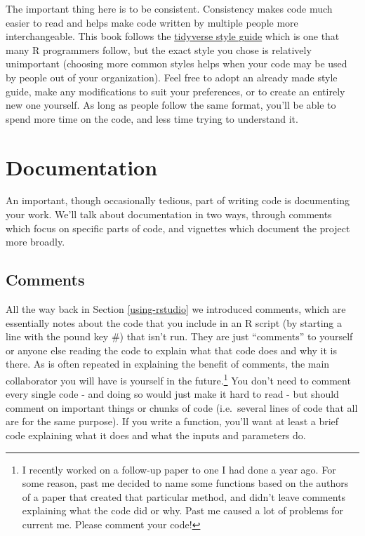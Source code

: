 \documentclass[
  12pt,
]{book}
\begin{document}
The important thing here is to be consistent. Consistency makes code much easier to read and helps make code written by multiple people more interchangeable. This book follows the \href{https://style.tidyverse.org/}{tidyverse style guide} which is one that many R programmers follow, but the exact style you chose is relatively unimportant (choosing more common styles helps when your code may be used by people out of your organization). Feel free to adopt an already made style guide, make any modifications to suit your preferences, or to create an entirely new one yourself. As long as people follow the same format, you'll be able to spend more time on the code, and less time trying to understand it.

\hypertarget{documentation}{%
\section{Documentation}\label{documentation}}

An important, though occasionally tedious, part of writing code is documenting your work. We'll talk about documentation in two ways, through comments which focus on specific parts of code, and vignettes which document the project more broadly.

\hypertarget{comments}{%
\subsection{Comments}\label{comments}}

All the way back in Section \ref{using-rstudio} we introduced comments, which are essentially notes about the code that you include in an R script (by starting a line with the pound key \#) that isn't run. They are just ``comments'' to yourself or anyone else reading the code to explain what that code does and why it is there. As is often repeated in explaining the benefit of comments, the main collaborator you will have is yourself in the future.\footnote{I recently worked on a follow-up paper to one I had done a year ago. For some reason, past me decided to name some functions based on the authors of a paper that created that particular method, and didn't leave comments explaining what the code did or why. Past me caused a lot of problems for current me. Please comment your code!} You don't need to comment every single code - and doing so would just make it hard to read - but should comment on important things or chunks of code (i.e.~several lines of code that all are for the same purpose). If you write a function, you'll want at least a brief code explaining what it does and what the inputs and parameters do.
\end{document}
